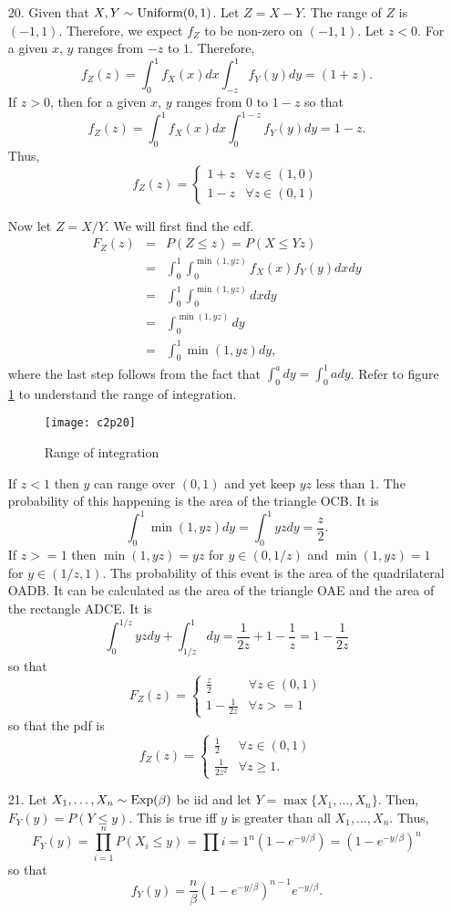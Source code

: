 \documentclass{article}
\begin{document}
\begin{enumerate}
\item[20.] Given that $X, Y \sim \text{Uniform}(0, 1)$. Let $Z = X - Y$. The range of $Z$
is $(-1, 1)$. Therefore, we expect $f_Z$ to be non-zero on $(-1, 1)$. Let 
$z < 0$. For a given $x$, $y$ ranges from $-z$ to $1$. Therefore,
\[
f_Z(z) = \int_0^1f_X(x)dx\int_{-z}^1f_Y(y)dy = (1 + z).
\]
If $z > 0$, then for a given $x$, $y$ ranges from $0$ to $1 - z$ so that
\[
f_Z(z) = \int_0^1f_X(x)dx\int_0^{1 - z}f_Y(y)dy = 1 - z.
\]
Thus,
\begin{equation}
f_Z(z) = \begin{cases}
1 + z & \forall z \in (1, 0) \\
1 - z & \forall z \in (0, 1)
\end{cases}
\end{equation}

Now let $Z = X/Y$. We will first find the cdf. 
\begin{eqnarray*}
F_Z(z) &=& P(Z \le z) = P(X \le Yz) \\
 &=& \int_0^1\int_0^{\min(1, yz)}f_X(x)f_Y(y)dxdy \\
 &=& \int_0^1\int_0^{\min(1, yz)}dxdy \\
 &=& \int_0^{\min(1, yz)}dy \\
 &=& \int_0^1 \min(1, yz)dy,
\end{eqnarray*}
where the last step follows from the fact that $\int_0^a dy = \int_0^1 ady$.
Refer to figure \ref{c2f3} to understand the range of integration.
\begin{figure}
\centering
\texttt{[image: c2p20]}
\caption{Range of integration}\label{c2f3}
\end{figure}
If $z < 1$ then $y$ can range over $(0, 1)$ and yet keep $yz$ less than $1$.
The probability of this happening is the area of the triangle OCB. It is
\[
\int_0^1 \min(1, yz)dy = \int_0^1 yz dy = \frac{z}{2}.
\]
If $z >= 1$ then $\min(1, yz) = yz$ for $y \in (0, 1/z)$ and $\min(1, yz) = 1$
for $y \in (1/z, 1)$. Ths probability of this event is the area of the 
quadrilateral OADB. It can be calculated as the area of the triangle OAE and
the area of the rectangle ADCE. It is
\[
\int_0^{1/z}yzdy + \int_{1/z}^1 dy = \frac{1}{2z} + 1 - \frac{1}{z} = 
1 - \frac{1}{2z}
\]
so that
\[
F_Z(z) = \begin{cases}
\frac{z}{2} & \forall z \in (0, 1) \\
1 - \frac{1}{2z} & \forall z >= 1
\end{cases}
\]
so that the pdf is
\[
f_Z(z) = \begin{cases}
\frac{1}{2} & \forall z \in (0, 1) \\
\frac{1}{2z^2} & \forall z \ge 1.
\end{cases}
\]

\item[21.] Let $X_1, \ldots, X_n \sim \text{Exp}(\beta)$ be iid and let $Y = 
\max\{X_1, \ldots, X_n\}$. Then, $F_Y(y) = P(Y \le y)$. This is true iff $y$ is
greater than all $X_1, \ldots, X_n$. Thus,
\[
F_Y(y) = \prod_{i=1}^n P(X_i \le y) = \prod{i=1}^n(1 - e^{-y/\beta}) = 
(1 - e^{-y/\beta})^n
\]
so that
\[
f_Y(y) = \frac{n}{\beta}(1 - e^{-y/\beta})^{n-1}e^{-y/\beta}.
\]
\end{enumerate}
\end{document}
